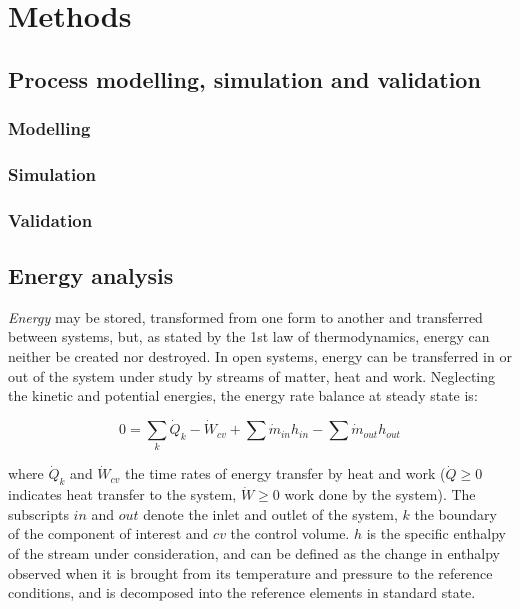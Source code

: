 \documentclass[final,times,5p]{elsarticle}
\begin{document}
\section{Methods}
\label{sec:methods}

	\subsection{Process modelling, simulation and validation}

		\subsubsection{Modelling}

		\subsubsection{Simulation}
	
		\subsubsection{Validation}
			
	\subsection{Energy analysis}
	\label{subsec:energy_analysis}
		
	\emph{Energy} may be stored, transformed from one form to another and transferred between systems, but, as stated by the 1st law of thermodynamics, energy can neither be created nor destroyed. In open systems, energy can be transferred in or out of the system under study by streams of matter, heat and work. Neglecting the kinetic and potential energies, the energy rate balance at steady state is:
	
	\begin{equation}
	0=\sum_k \dot{Q}_{k}-\dot{W}_{cv} + \sum \dot{m}_{in} h_{in} - \sum \dot{m}_{out} h_{out}
	\end{equation}
	
	where $\dot{Q}_{k}$ and $\dot{W}_{cv}$ the time rates of energy transfer by heat and work ($\dot{Q}\ge0$ indicates heat transfer to the system, $\dot{W}\ge0$ work done by the system). The subscripts $in$ and $out$ denote the inlet and outlet of the system, $k$ the boundary of the component of interest and $cv$ the control volume. $h$ is the specific enthalpy of the stream under consideration, and can be defined as the change in enthalpy observed when it is brought from its temperature and pressure to the reference conditions, and is decomposed into the reference elements in standard state. 
	
\end{document}
